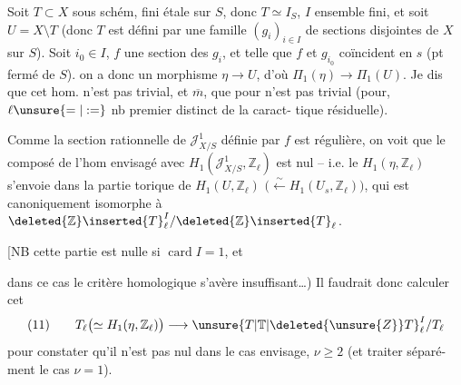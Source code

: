 Soit $T\subset X$ sous schém, fini étale sur $S$, donc $T\simeq I_S$, $I$ ensemble fini, et soit $U=X\setminus T$ (donc $T$ est défini par une famille $(g_i)_{i\in I}$ de sections disjointes de $X$ sur $S$).  Soit  $i_0\in I$, $f$ une section  des $g_i$, et telle que  $f$ et $g_{i_0}$ coïncident en $s$ (pt fermé de $S$).      on a donc un morphisme $\eta\longrightarrow U$, d'où $\Pi_1(\eta)\longrightarrow\Pi_1(U)$. Je dis que cet hom. n'est pas trivial,  et $\overline m$,  que pour 
n'est pas trivial (pour,  $\ell\unsure{=|:=}$ nb premier distinct de la caract-\newline
tique résiduelle).

Comme la section rationnelle de $\mathcal J^1_{X/S}$ définie par $f$ est régulière, on voit que le composé de l'hom envisagé avec $H_1(\mathcal J^1_{X/S},\mathbb Z_\ell)$ est nul -- i.e. le $H_1(\eta,\mathbb Z_\ell)$ s'envoie dans la partie torique de $H_1(U,\mathbb Z_\ell)$ $\bigl(\xleftarrow{\sim}H_1(U_s,\mathbb Z_\ell)\bigr)$, qui est canoniquement isomorphe à $\deleted{\mathbb Z}\inserted{T}_\ell^I/\deleted{\mathbb Z}\inserted{T}_\ell$.

[NB cette partie est nulle si $\operatorname{card}I=1$, et

dans ce cas le critère homologique s'avère insuffisant\ldots) Il faudrait donc calculer cet 
\[
(11)\qquad T_\ell\bigl(\simeq H_1(\eta,\mathbb Z_\ell)\bigr)\longrightarrow\unsure{T|\mathbb T|\deleted{\unsure{Z}}T}_\ell^I/T_\ell
\]
pour constater qu'il n'est pas nul dans le cas envisage, $\nu\geqslant2$ (et traiter séparé-\newline
ment le cas $\nu=1$).

